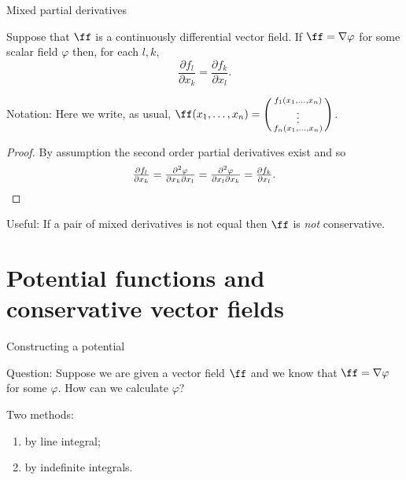     {Mixed partial derivatives}

    \begin{theorem}
        Suppose that \(\ff\) is a continuously differential vector field.
        If \(\ff = \nabla \varphi\) for some scalar field \(\varphi\) then, for each \(l,k\),
        \[
            \frac{\partial f_l}{\partial x_k} = \frac{\partial f_k}{\partial x_l}.
        \]
    \end{theorem}

    {Notation:} Here we write, as usual, \(\ff(x_1,\ldots,x_n) = \left(\begin{smallmatrix}
            f_1(x_1,\ldots,x_n)\\
            \vdots \\
            f_n(x_1,\ldots,x_n)
        \end{smallmatrix}\right)\).

    \begin{proof}
        By assumption the second order partial derivatives exist and so
        \[
            \tfrac{\partial f_l}{\partial x_k}
            = \tfrac{\partial^2 \varphi}{\partial x_k \partial x_l}
            = \tfrac{\partial^2 \varphi}{\partial x_l \partial x_k}
            = \tfrac{\partial f_k}{\partial x_l}. \qedhere
        \]
    \end{proof}

    {Useful:}
    If a pair of mixed derivatives is not equal then \(\ff\) is \emph{not} conservative.




\section{Potential functions and conservative vector fields}


    {Constructing a potential}

    {Question:}
    Suppose we are given a vector field \(\ff\) and we know that \(\ff = \nabla \varphi\) for some \(\varphi\).
    How can we calculate \(\varphi\)?

    {Two methods:}
    \begin{enumerate}
        \item by line integral;
        \item by indefinite integrals.
    \end{enumerate}










